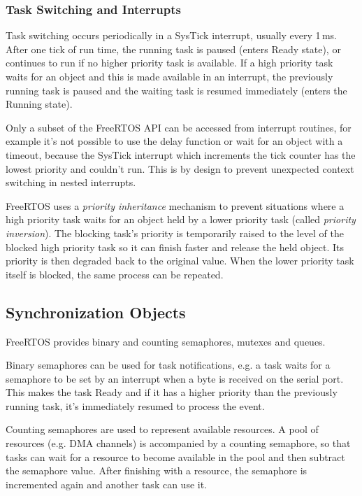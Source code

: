 \subsubsection{Task Switching and Interrupts}

Task switching occurs periodically in a SysTick interrupt, usually every 1\,ms. After one tick of run time, the running task is paused (enters Ready state), or continues to run if no higher priority task is available. If a high priority task waits for an object and this is made available in an interrupt, the previously running task is paused and the waiting task is resumed immediately (enters the Running state). 

Only a subset of the FreeRTOS \gls{API} can be accessed from interrupt routines, for example it's not possible to use the delay function or wait for an object with a timeout, because the SysTick interrupt which increments the tick counter has the lowest priority and couldn't run. This is by design to prevent unexpected context switching in nested interrupts.

FreeRTOS uses a \textit{priority inheritance} mechanism to prevent situations where a high priority task waits for an object held by a lower priority task (called \textit{priority inversion}). The blocking task's priority is temporarily raised to the level of the blocked high priority task so it can finish faster and release the held object. Its priority is then degraded back to the original value. When the lower priority task itself is blocked, the same process can be repeated.

\subsection{Synchronization Objects}

FreeRTOS provides binary and counting semaphores, mutexes and queues. 

Binary semaphores can be used for task notifications, e.g. a task waits for a semaphore to be set by an interrupt when a byte is received on the serial port. This makes the task Ready and if it has a higher priority than the previously running task, it's immediately resumed to process the event.

Counting semaphores are used to represent available resources. A pool of resources (e.g. \gls{DMA} channels) is accompanied by a counting semaphore, so that tasks can wait for a resource to become available in the pool and then subtract the semaphore value. After finishing with a resource, the semaphore is incremented again and another task can use it.

